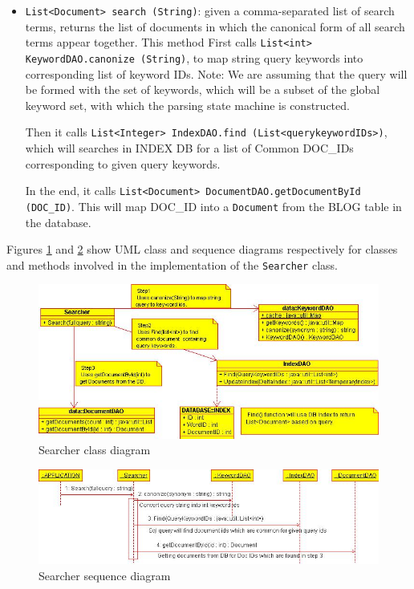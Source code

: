 \documentclass[10pt]{report}
\begin{document}
\begin{itemize}
\item \texttt{List<Document> search (String)}: given a comma-separated
  list of search terms, returns the list of documents in which the
  canonical form of all search terms appear together. This method
  First calls \texttt{List<int> KeywordDAO.canonize (String)}, to map
  string query keywords into corresponding list of keyword IDs.  Note:
  We are assuming that the query will be formed with the set of
  keywords, which will be a subset of the global keyword set, with
  which the parsing state machine is constructed.

  Then it calls \texttt{List<Integer> IndexDAO.find
    (List<querykeywordIDs>)}, which will searches in INDEX DB for a
  list of Common DOC\_IDs corresponding to given query keywords.

  In the end, it calls \texttt{List<Document>
    DocumentDAO.getDocumentById (DOC\_ID)}. This will map DOC\_ID into
  a \texttt{Document} from the BLOG table in the database. 
\end{itemize}
 
Figures \ref{fig:searcherclassdiagram} and
\ref{fig:searchersequencediagram} show UML class and sequence
diagrams respectively for classes and methods involved in the
implementation of the \texttt{Searcher} class.


\begin{figure}
  \begin{center}
        \includegraphics[width=\textwidth,height=!]{searcherclassdiagram}
  \end{center}
  \caption{Searcher class diagram}
  \label{fig:searcherclassdiagram}
\end{figure} 

\begin{figure}
  \begin{center}
        \includegraphics[width=\textwidth,height=!]{searchersequencediagram}
  \end{center}
  \caption{Searcher sequence diagram}
  \label{fig:searchersequencediagram}
\end{figure} 
\end{document}
